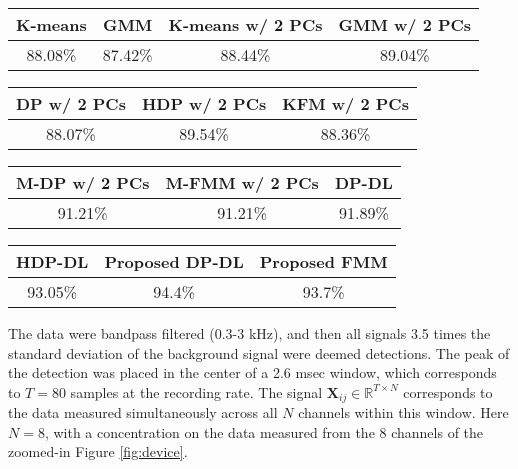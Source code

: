 \documentclass[journal]{IEEEtran}
\def\bf{\mathbf}
\newcommand{\Xmat}{{\bf X}}
\begin{document}
\begin{table}[t]
\begin{center}
\begin{tabular}{|c|c|c|c|}
\hline K-means & GMM & K-means w/ 2 PCs & GMM w/ 2 PCs   \\
\hline
88.08\% & 87.42\% &  88.44\% & 89.04\%   \\
\hline
\end{tabular}
\begin{tabular}{|c|c|c|}
\hline  DP w/ 2 PCs & HDP w/ 2 PCs & KFM w/ 2 PCs    \\
\hline
     88.07\% & 89.54\% & 88.36\% \\
\hline
\end{tabular}
\begin{tabular}{|c|c|c|}
\hline  M-DP w/ 2 PCs &  M-FMM w/ 2 PCs & DP-DL    \\
\hline
      91.21\%  & 91.21\% & 91.89\% \\
\hline
\end{tabular}
\begin{tabular}{|c|c|c|}
\hline  HDP-DL &  Proposed DP-DL &  Proposed FMM\\
\hline
  93.05\% & 94.4\%  & 93.7\%\\
\hline
\end{tabular}\end{center}
\end{table}



The data were bandpass filtered (0.3-3 kHz), and
then all signals 3.5 times the standard deviation of the background
signal were deemed detections. The peak of the detection was placed
in the center of a 2.6 msec window, which corresponds to $T=80$
samples at the recording rate. The signal
$\Xmat_{ij}\in\mathbb{R}^{T\times N}$ corresponds to the data
measured simultaneously across all $N$ channels within this window.
Here $N=8$, with a concentration on the data measured from the 8
channels of the zoomed-in Figure \ref{fig:device}.

\end{document}
